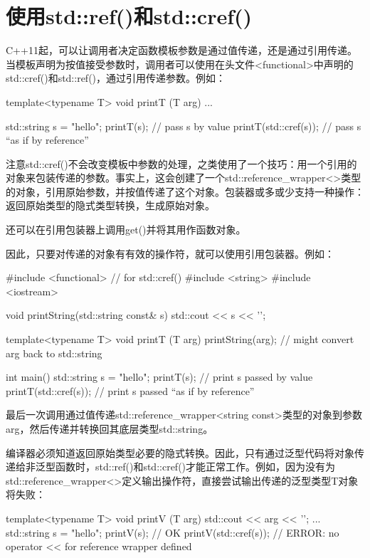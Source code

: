 \section{使用std::ref()和std::cref()}
C++11起，可以让调用者决定函数模板参数是通过值传递，还是通过引用传递。当模板声明为按值接受参数时，调用者可以使用在头文件<functional>中声明的std::cref()和std::ref()，通过引用传递参数。例如：

\begin{cpp}
template<typename T>
void printT (T arg) {
	...
}

std::string s = "hello";
printT(s); // pass s by value
printT(std::cref(s)); // pass s “as if by reference”
\end{cpp}

注意std::cref()不会改变模板中参数的处理，之类使用了一个技巧：用一个引用的对象来包装传递的参数。事实上，这会创建了一个std::reference\_wrapper<>类型的对象，引用原始参数，并按值传递了这个对象。包装器或多或少支持一种操作：返回原始类型的隐式类型转换，生成原始对象。

\begin{notice}
还可以在引用包装器上调用get()并将其用作函数对象。
\end{notice}

因此，只要对传递的对象有有效的操作符，就可以使用引用包装器。例如：

\begin{cpp}
#include <functional> // for std::cref()
#include <string>
#include <iostream>

void printString(std::string const& s)
{
	std::cout << s << '\n';
}

template<typename T>
void printT (T arg)
{
	printString(arg); // might convert arg back to std::string
}

int main()
{
	std::string s = "hello";
	printT(s); // print s passed by value
	printT(std::cref(s)); // print s passed “as if by reference”
}
\end{cpp}

最后一次调用通过值传递std::reference\_wrapper<string const>类型的对象到参数arg，然后传递并转换回其底层类型std::string。

编译器必须知道返回原始类型必要的隐式转换。因此，只有通过泛型代码将对象传递给非泛型函数时，std::ref()和std::cref()才能正常工作。例如，因为没有为std::reference\_wrapper<>定义输出操作符，直接尝试输出传递的泛型类型T对象将失败：

\begin{cpp}
template<typename T>
void printV (T arg) {
	std::cout << arg << '\n';
}
...
std::string s = "hello";
printV(s); // OK
printV(std::cref(s)); // ERROR: no operator << for reference wrapper defined
\end{cpp}

